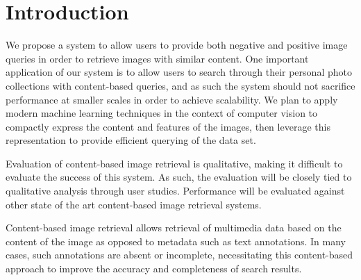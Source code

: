 \section{Introduction}
We propose a system to allow users to provide both negative and positive image queries in order to retrieve images with similar content.
One important application of our system is to allow users to search through their personal photo collections with content-based queries, and as such the
system should not sacrifice performance at smaller scales in order to achieve scalability.
We plan to apply modern machine learning techniques in the context of computer vision to compactly express the content and features of the images, then leverage
this representation to provide efficient querying of the data set.

Evaluation of content-based image retrieval is qualitative, making it difficult to evaluate the success of this system.
As such, the evaluation will be closely tied to qualitative analysis through user studies.
Performance will be evaluated against other state of the art content-based image retrieval systems.

Content-based image retrieval allows retrieval of multimedia data based on the content of the image as opposed to metadata such as text annotations.
In many cases, such annotations are absent or incomplete, necessitating this content-based approach to improve the accuracy and completeness of search results.


